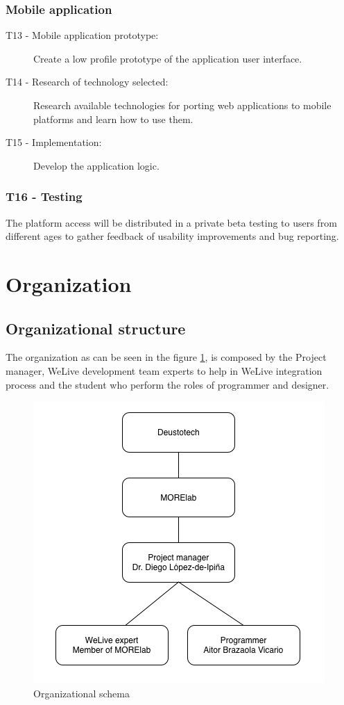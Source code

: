 \documentclass{DeustoFDP}
\begin{document}
\subsubsection{Mobile application}
\begin{description}
	\item[T13 - Mobile application prototype:] Create a low profile prototype of the application user interface.
	\item[T14 - Research of technology selected:] Research available technologies for porting web applications to mobile platforms and learn how to use them.
	\item[T15 - Implementation:] Develop the application logic.
\end{description}

\subsubsection{T16 - Testing}
The platform access will be distributed in a private beta testing to users from different ages to gather feedback of usability improvements and bug reporting. 

\section{Organization}
\subsection{Organizational structure}
The organization as can be seen in the figure \ref{fig:esquemaorganizacion}, is composed by the Project manager, WeLive development team experts to help in WeLive integration process and the student who perform the roles of programmer and designer.

\begin{figure}[h]
	\centering
	\includegraphics[width=0.7\linewidth]{fig/esquemaorganizacion}
	\caption[Organizational schema]{Organizational schema}
	\label{fig:esquemaorganizacion}
\end{figure}
\end{document}
